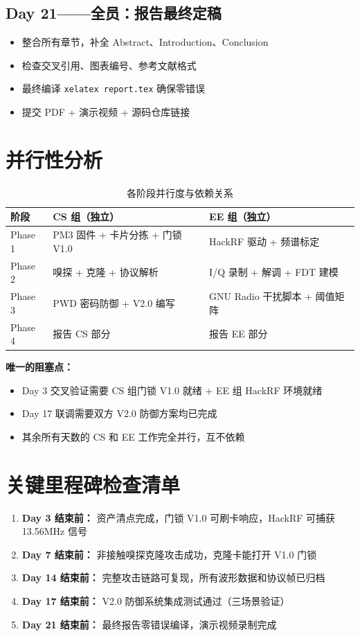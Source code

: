 \documentclass[12pt,a4paper]{ctexart}
\begin{document}
\subsection*{Day 21——全员：报告最终定稿}
\begin{itemize}[nosep]
    \item 整合所有章节，补全 Abstract、Introduction、Conclusion
    \item 检查交叉引用、图表编号、参考文献格式
    \item 最终编译 \texttt{xelatex report.tex} 确保零错误
    \item 提交 PDF  + 演示视频 + 源码仓库链接
\end{itemize}

\section{并行性分析}

\begin{table}[h]
\centering
\caption{各阶段并行度与依赖关系}
\begin{tabular}{p{}p{}p{}}
\toprule
\textbf{阶段} & \textbf{CS 组（独立）} & \textbf{EE 组（独立）} \\
\midrule
Phase 1 & PM3 固件 + 卡片分拣 + 门锁 V1.0 & HackRF 驱动 + 频谱标定 \\
Phase 2 & 嗅探 + 克隆 + 协议解析 & I/Q 录制 + 解调 + FDT 建模 \\
Phase 3 & PWD 密码防御 + V2.0 编写 & GNU Radio 干扰脚本 + 阈值矩阵 \\
Phase 4 & 报告 CS 部分 & 报告 EE 部分 \\
\bottomrule
\end{tabular}
\end{table}

\vskip 12pt
\noindent\textbf{唯一的阻塞点：}
\begin{itemize}[nosep]
    \item Day 3 交叉验证需要 CS 组门锁 V1.0 就绪 + EE 组 HackRF 环境就绪
    \item Day 17 联调需要双方 V2.0 防御方案均已完成
    \item 其余所有天数的 CS 和 EE 工作完全并行，互不依赖
\end{itemize}

\section{关键里程碑检查清单}

\begin{enumerate}[label=\textbf{M\arabic*:},leftmargin=*]
    \item \textbf{Day 3 结束前：} 资产清点完成，门锁 V1.0 可刷卡响应，HackRF 可捕获 13.56MHz 信号
    \item \textbf{Day 7 结束前：} 非接触嗅探克隆攻击成功，克隆卡能打开 V1.0 门锁
    \item \textbf{Day 14 结束前：} 完整攻击链路可复现，所有波形数据和协议帧已归档
    \item \textbf{Day 17 结束前：} V2.0 防御系统集成测试通过（三场景验证）
    \item \textbf{Day 21 结束前：} 最终报告零错误编译，演示视频录制完成
\end{enumerate}
\end{document}
